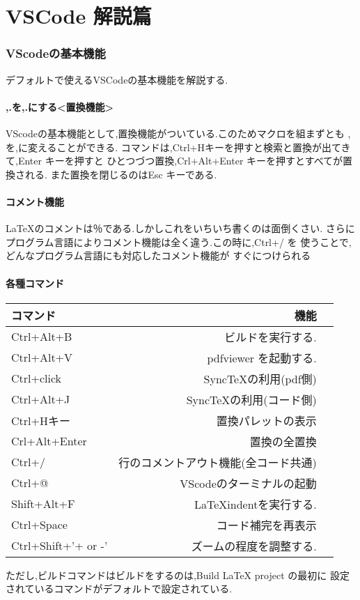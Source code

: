 \documentclass{ltjsarticle}
\begin{document}
\part{VSCode 解説篇}
\section{VScodeの基本機能}
デフォルトで使えるVSCodeの基本機能を解説する.
\subsection{,.を,.にする<置換機能>}
VScodeの基本機能として,置換機能がついている.このためマクロを組まずとも
,を,に変えることができる.
コマンドは,Ctrl+Hキーを押すと検索と置換が出てきて,Enter キーを押すと
ひとつづつ置換,Crl+Alt+Enter キーを押すとすべてが置換される.
また置換を閉じるのはEsc キーである.
\subsection{コメント機能}
\LaTeX のコメントは％である.しかしこれをいちいち書くのは面倒くさい.
さらにプログラム言語によりコメント機能は全く違う.この時に,Ctrl+/ を
使うことで,どんなプログラム言語にも対応したコメント機能が
すぐにつけられる
\subsection{各種コマンド}
\begin{center}
  \begin{tabular}{lrr} \hline
    コマンド            & 機能                  \\ \hline
    Ctrl+Alt+B          & ビルドを実行する.           \\
    Ctrl+Alt+V          & pdfviewer を起動する.    \\
    Ctrl+click          & SyncTeXの利用(pdf側)    \\
    Ctrl+Alt+J          & SyncTeXの利用(コード側)    \\
    Ctrl+Hキー            & 置換パレットの表示           \\
    Crl+Alt+Enter       & 置換の全置換              \\
    Ctrl+/              & 行のコメントアウト機能(全コード共通) \\
    Ctrl+@              & VScodeのターミナルの起動     \\
    Shift+Alt+F         & LaTeXindentを実行する.\\
    Ctrl+Space          & コード補完を再表示\\
    Ctrl+Shift+'+ or -' & ズームの程度を調整する.        \\ \hline
  \end{tabular}
\end{center}
ただし,ビルドコマンドはビルドをするのは,Build LaTeX project の最初に
設定されているコマンドがデフォルトで設定されている.
\end{document}
